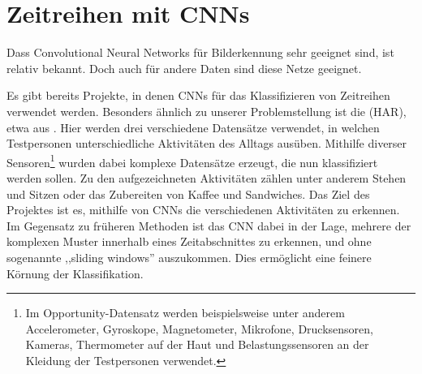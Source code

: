 \section{Zeitreihen mit CNNs}

Dass Convolutional Neural Networks für Bilderkennung sehr geeignet sind, ist relativ bekannt. Doch auch für andere Daten sind diese Netze geeignet.

Es gibt bereits Projekte, in denen CNNs für das Klassifizieren von Zeitreihen verwendet werden. Besonders ähnlich zu unserer Problemstellung ist die  (HAR), etwa aus  \citep{dense_labeling}. Hier werden drei verschiedene Datensätze verwendet, in welchen Testpersonen unterschiedliche Aktivitäten des Alltags ausüben. Mithilfe diverser Sensoren\footnote{Im Opportunity-Datensatz \citep{opportunity} werden beispielsweise unter anderem Accelerometer, Gyroskope, Magnetometer, Mikrofone, Drucksensoren, Kameras, Thermometer auf der Haut und Belastungssensoren an der Kleidung der Testpersonen verwendet.} wurden dabei komplexe Datensätze erzeugt, die nun klassifiziert werden sollen. Zu den aufgezeichneten Aktivitäten zählen unter anderem Stehen und Sitzen oder das Zubereiten von Kaffee und Sandwiches. Das Ziel des Projektes ist es, mithilfe von CNNs die verschiedenen Aktivitäten zu erkennen. Im Gegensatz zu früheren Methoden ist das CNN dabei in der Lage, mehrere der komplexen Muster innerhalb eines Zeitabschnittes zu erkennen, und ohne sogenannte ,,sliding windows'' auszukommen. Dies ermöglicht eine feinere Körnung der Klassifikation.



